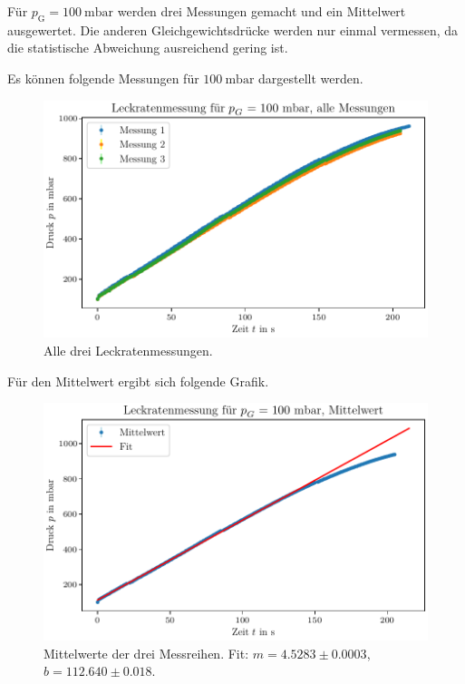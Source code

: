 Für $p_\text{G} = \SI{100}{\milli\bar}$ werden drei Messungen gemacht und ein Mittelwert ausgewertet. Die anderen Gleichgewichtsdrücke werden nur einmal vermessen, da die statistische Abweichung ausreichend gering ist.

Es können folgende Messungen für $\SI{100}{\milli\bar}$ dargestellt werden.

\begin{figure}[H]
    \centering
    \includegraphics[width=\textwidth]{plots/DP_Leck_100mbar_alle.pdf}
    \caption{Alle drei Leckratenmessungen.}
    \label{fig:DP_leck_100mbar_alle}
\end{figure}

Für den Mittelwert ergibt sich folgende Grafik.

\begin{figure}[H]
    \centering
    \includegraphics[width=\textwidth]{plots/DP_Leck1_100mbar_mittelwert.pdf}
    \caption{Mittelwerte der drei Messreihen. Fit: $m = \num{4.5283} \pm \num{0.0003}$, $b = \num{112.640} \pm \num{0.018}$.}
    \label{fig:DP_Leck_100mbar_mittelwert}
\end{figure}

